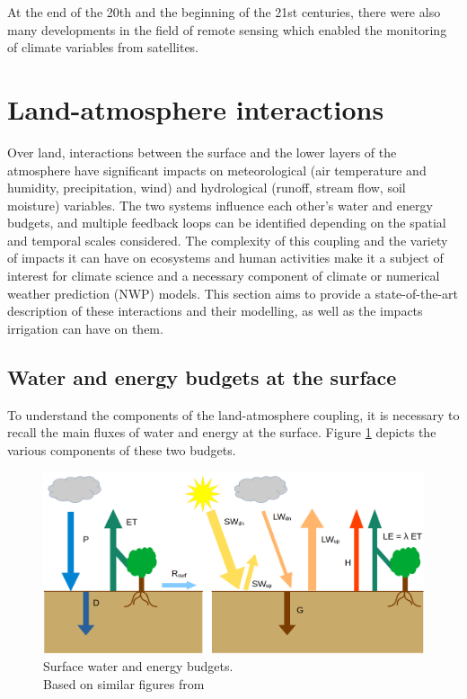At the end of the 20th and the beginning of the 21st centuries, there were also many developments in the field of remote sensing which enabled the monitoring of climate variables from satellites. 



\section{Land-atmosphere interactions}

Over land, interactions between the surface and the lower layers of the atmosphere have significant impacts on meteorological (air temperature and humidity, precipitation, wind) and hydrological (runoff, stream flow, soil moisture) variables. The two systems influence each other's water and energy budgets, and multiple feedback loops can be identified depending on the spatial and temporal scales considered. The complexity of this coupling and the variety of impacts it can have on ecosystems and human activities make it a subject of interest for climate science and a necessary component of climate or numerical weather prediction (NWP) models. This section aims to provide a state-of-the-art description of these interactions and their modelling, as well as the impacts irrigation can have on them.

\subsection{Water and energy budgets at the surface}
To understand the components of the land-atmosphere coupling, it is necessary to recall the main fluxes of water and energy at the surface. 
Figure \ref{fig:budgets} depicts the various components of these two budgets.

\begin{figure}[ht]
    \centering
    \includegraphics[width=\textwidth]{images/intro/budgets.png}
    \caption{Surface water and energy budgets. \\Based on similar figures from \citet{seneviratne_investigating_2010}%
    }
    \label{fig:budgets}
\end{figure}

